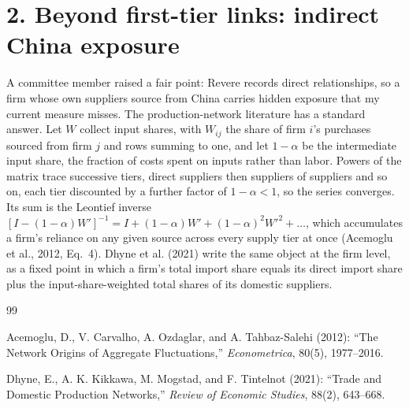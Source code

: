 \documentclass[11pt]{article}
\begin{document}
\section*{2. Beyond first-tier links: indirect China exposure}

A committee member raised a fair point: Revere records direct relationships,
so a firm whose own suppliers source from China carries hidden exposure that
my current measure misses. The production-network literature has a standard
answer. Let $W$ collect input shares, with $W_{ij}$ the share of firm $i$'s
purchases sourced from firm $j$ and rows summing to one, and let $1-\alpha$ be
the intermediate input share, the fraction of costs spent on inputs rather than
labor. Powers of the matrix trace successive tiers, direct suppliers then
suppliers of suppliers and so on, each tier discounted by a further factor of
$1-\alpha<1$, so the series converges. Its sum is the Leontief inverse
$[I-(1-\alpha)W']^{-1} = I + (1-\alpha)W' + (1-\alpha)^2 W'^2 + \dots$, which
accumulates a firm's reliance on any given source across every supply tier at
once (Acemoglu et al., 2012, Eq.~4). Dhyne et al. (2021) write the same object
at the firm level, as a fixed point in which a firm's total import share
equals its direct import share plus the input-share-weighted total shares of
its domestic suppliers.

\begin{thebibliography}{99}

 Acemoglu, D., V. Carvalho, A. Ozdaglar, and
A. Tahbaz-Salehi (2012): ``The Network Origins of Aggregate Fluctuations,''
\emph{Econometrica}, 80(5), 1977--2016.

 Dhyne, E., A. K. Kikkawa, M. Mogstad, and F. Tintelnot
(2021): ``Trade and Domestic Production Networks,'' \emph{Review of Economic
Studies}, 88(2), 643--668.

\end{thebibliography}
\end{document}
